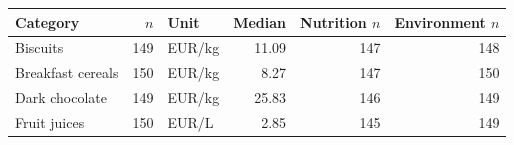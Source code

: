 \begin{tabular}{lrlrrr}
\toprule
Category & $n$ & Unit & Median & Nutrition $n$ & Environment $n$ \\
\midrule
Biscuits & 149 & EUR/kg & 11.09 & 147 & 148 \\
Breakfast cereals & 150 & EUR/kg & 8.27 & 147 & 150 \\
Dark chocolate & 149 & EUR/kg & 25.83 & 146 & 149 \\
Fruit juices & 150 & EUR/L & 2.85 & 145 & 149 \\
\bottomrule
\end{tabular}
